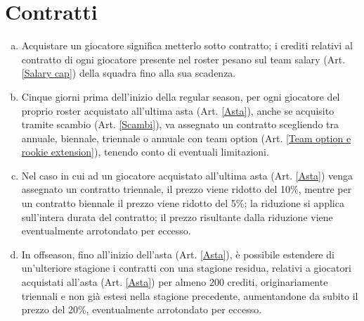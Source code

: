 \documentclass{article}
\begin{document}
\section{Contratti}\label{Contratti}
\begin{enumerate}[(a)]
\item Acquistare un giocatore significa metterlo sotto contratto; i crediti relativi al contratto di ogni giocatore presente nel roster pesano sul team salary (Art. \ref{Salary cap}) della squadra fino alla sua scadenza.
\item Cinque giorni prima dell'inizio della regular season, per ogni giocatore del proprio roster acquistato all'ultima asta (Art. \ref{Asta}), anche se acquisito tramite scambio (Art. \ref{Scambi}), va assegnato un contratto scegliendo tra annuale, biennale, triennale o annuale con team option (Art. \ref{Team option e rookie extension}), tenendo conto di eventuali limitazioni.
\item Nel caso in cui ad un giocatore acquistato all'ultima asta (Art. \ref{Asta}) venga assegnato un contratto triennale, il prezzo viene ridotto del 10\%, mentre per un contratto biennale il prezzo viene ridotto del 5\%; la riduzione si applica sull'intera durata del contratto; il prezzo risultante dalla riduzione viene eventualmente arrotondato per eccesso.
\item In offseason, fino all'inizio dell'asta (Art. \ref{Asta}), è possibile estendere di un'ulteriore stagione i contratti con una stagione residua, relativi a giocatori acquistati all'asta (Art. \ref{Asta}) per almeno 200 crediti, originariamente triennali e non già estesi nella stagione precedente, aumentandone da subito il prezzo del 20\%, eventualmente arrotondato per eccesso.
\end{enumerate}
\end{document}
